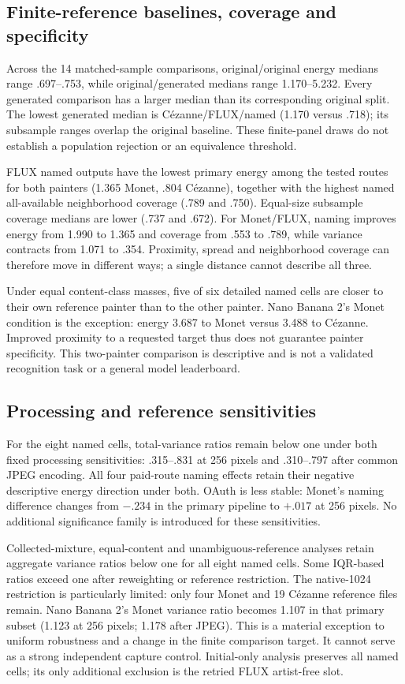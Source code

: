 \documentclass[11pt]{article}
\begin{document}
\subsection{Finite-reference baselines, coverage and specificity}
Across the 14 matched-sample comparisons, original/original energy medians range
.697--.753, while original/generated medians range 1.170--5.232. Every generated
comparison has a larger median than its corresponding original split. The lowest
generated median is Cézanne/FLUX/named (1.170 versus .718); its subsample ranges
overlap the original baseline. These finite-panel draws do not establish a
population rejection or an equivalence threshold.

FLUX named outputs have the lowest primary energy among the tested routes for
both painters (1.365 Monet, .804 Cézanne), together with the highest named
all-available neighborhood coverage (.789 and .750). Equal-size subsample
coverage medians are lower (.737 and .672). For Monet/FLUX, naming improves
energy from 1.990 to 1.365 and coverage from .553 to .789, while variance contracts
from 1.071 to .354. Proximity, spread and neighborhood coverage can therefore move
in different ways; a single distance cannot describe all three.

Under equal content-class masses, five of six detailed named cells are closer to
their own reference painter than to the other painter. Nano Banana 2's Monet
condition is the exception: energy 3.687 to Monet versus 3.488 to Cézanne.
Improved proximity to a requested target thus does not guarantee painter
specificity. This two-painter comparison is descriptive and is not a validated
recognition task or a general model leaderboard.

\subsection{Processing and reference sensitivities}
For the eight named cells, total-variance ratios remain below one under both
fixed processing sensitivities: .315--.831 at 256 pixels and .310--.797 after
common JPEG encoding. All four paid-route naming effects retain their negative
descriptive energy direction under both. OAuth is less stable: Monet's naming
difference changes from $-.234$ in the primary pipeline to $+.017$ at 256 pixels.
No additional significance family is introduced for these sensitivities.

Collected-mixture, equal-content and unambiguous-reference analyses retain
aggregate variance ratios below one for all eight named cells. Some IQR-based
ratios exceed one after reweighting or reference restriction. The native-1024
restriction is particularly limited: only four Monet and 19 Cézanne reference
files remain. Nano Banana 2's Monet variance ratio becomes 1.107 in that primary
subset (1.123 at 256 pixels; 1.178 after JPEG). This is a material exception to
uniform robustness and a change in the finite comparison target. It cannot serve
as a strong independent capture control. Initial-only analysis preserves all
named cells; its only additional exclusion is the retried FLUX artist-free slot.
\end{document}
